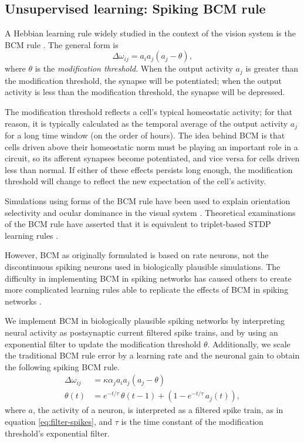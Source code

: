\documentclass[10pt,letterpaper]{article}
\begin{document}
\subsection{Unsupervised learning: Spiking BCM rule}

A Hebbian learning rule widely studied
in the context of the vision system
is the BCM rule \cite{Bienenstock1982}.
The general form is
\begin{equation}
	\Delta \omega_{ij} = a_i a_j (a_j - \theta),
\end{equation}
where $\theta$ is the \textit{modification threshold}.
When the output activity $a_j$ is
greater than the modification threshold,
the synapse will be potentiated;
when the output activity is less than the modification threshold,
the synapse will be depressed.

The modification threshold reflects a cell's
typical homeostatic activity;
for that reason, it is typically calculated as
the temporal average of the output activity $a_j$
for a long time window (on the order of hours).
The idea behind BCM is that cells
driven above their homeostatic norm
must be playing an important role in a circuit,
so its afferent synapses become potentiated,
and vice versa for cells driven less than normal.
If either of these effects persists long enough,
the modification threshold will change
to reflect the new expectation
of the cell's activity.

Simulations using forms of the BCM rule
have been used to explain orientation selectivity
and ocular dominance in the visual system \cite{Bienenstock1982}.
Theoretical examinations of the BCM rule
have asserted that it is equivalent
to triplet-based STDP learning rules
\cite{Pfister2006}.

However, BCM as originally formulated
is based on rate neurons,
not the discontinuous spiking neurons
used in biologically plausible simulations.
The difficulty in implementing BCM in spiking networks
has caused others to create more complicated learning rules
able to replicate the effects of BCM in spiking networks
\cite{Pfister2006,Yger2012}.

We implement BCM in biologically plausible spiking networks
by interpreting neural activity as
postsynaptic current filtered spike trains,
and by using an exponential filter
to update the modification threshold $\theta$.
Additionally, we scale the traditional BCM rule error
by a learning rate and the neuronal gain
to obtain the following spiking BCM rule.
\begin{align} \label{eq:bcm}
  \Delta \omega_{ij} &= \kappa \alpha_j a_i a_j (a_j - \theta) \nonumber \\
  \theta(t) &= e^{-t / \tau} \, \theta(t-1) +
               (1 - e^{-t / \tau} \, a_j(t)),
\end{align}
where $a$, the activity of a neuron,
is interpreted as a filtered spike train,
as in equation \eqref{eq:filter-spikes},
and $\tau$ is
the time constant of
the modification threshold's exponential filter.
\end{document}
